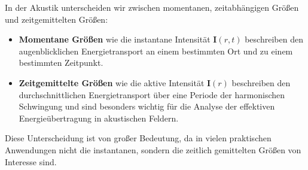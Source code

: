 In der Akustik unterscheiden wir zwischen momentanen, zeitabhängigen Größen und zeitgemittelten Größen:

\begin{itemize}
\item \textbf{Momentane Größen} wie die instantane Intensität $\boldsymbol{I}(r,t)$ beschreiben den augenblicklichen Energietransport an einem bestimmten Ort und zu einem bestimmten Zeitpunkt.

\item \textbf{Zeitgemittelte Größen} wie die aktive Intensität $\boldsymbol{I}(r)$ beschreiben den durchschnittlichen Energietransport über eine Periode der harmonischen Schwingung und sind besonders wichtig für die Analyse der effektiven Energieübertragung in akustischen Feldern.
\end{itemize}

Diese Unterscheidung ist von großer Bedeutung, da in vielen praktischen Anwendungen nicht die instantanen, sondern die zeitlich gemittelten Größen von Interesse sind.




